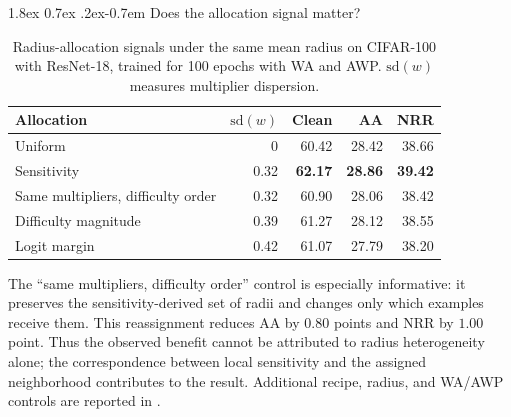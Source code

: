 \documentclass{article} %
\makeatletter
\theoremstyle{plain}
\renewcommand{\paragraph}{\@startsection{paragraph}{4}{\z@}%
  {1.8ex \@plus 0.7ex \@minus .2ex}{-0.7em}%
  {\normalfont\normalsize\bfseries}}
\makeatother
\begin{document}
\paragraph{Does the allocation signal matter?}
\begin{table}[!htbp]
  \centering
  \small
  \setlength{\tabcolsep}{4.5pt}
  \caption{
  Radius-allocation signals under the same mean radius on CIFAR-100 with
  ResNet-18, trained for 100 epochs with WA and AWP.
  \(\mathrm{sd}(w)\) measures multiplier dispersion.
  }
  \label{tab:allocation}
  \begin{tabular}{lrrrr}
    \toprule
    Allocation & \(\mathrm{sd}(w)\) & Clean & AA & NRR \\
    \midrule
    Uniform
      & 0 & 60.42 & 28.42 & 38.66 \\
    Sensitivity
      & 0.32 & \textbf{62.17} & \textbf{28.86} & \textbf{39.42} \\
    Same multipliers, difficulty order
      & 0.32 & 60.90 & 28.06 & 38.42 \\
    Difficulty magnitude
      & 0.39 & 61.27 & 28.12 & 38.55 \\
    Logit margin
      & 0.42 & 61.07 & 27.79 & 38.20 \\
    \bottomrule
  \end{tabular}
\end{table}

The ``same multipliers, difficulty order'' control is especially informative:
it preserves the sensitivity-derived set of radii and changes only which
examples receive them. This reassignment reduces AA by \(0.80\) points and
NRR by \(1.00\) point. Thus the observed benefit cannot be attributed to
radius heterogeneity alone; the correspondence between local sensitivity and
the assigned neighborhood contributes to the result. Additional recipe,
radius, and WA/AWP controls are reported
in .
\end{document}
